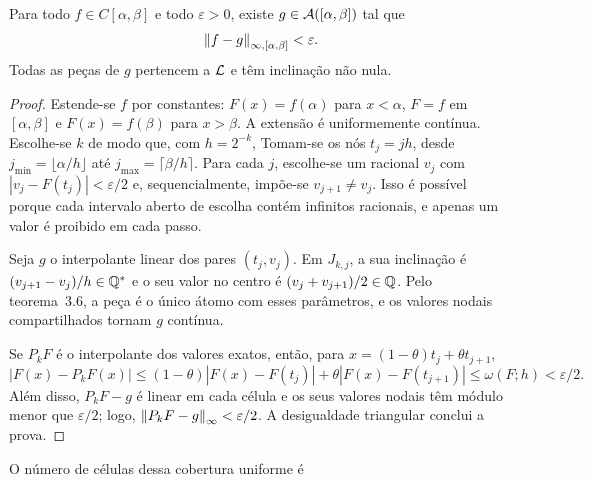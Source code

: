 \begin{teorema}\label{map:artigo_1:4.2}
Para todo $f\in C[\alpha,\beta]$ e todo $\varepsilon>0$, existe $g\in\mathcal A([\alpha,\beta])$ tal que
\[
\left\|f-g\right\|_{\infty,[\alpha,\beta]}<\varepsilon.
\]
Todas as peças de $g$ pertencem a $\mathcal L$ e têm inclinação não nula.
\end{teorema}
\begin{proof}
Estende-se $f$ por constantes: $F(x)=f(\alpha)$ para $x<\alpha$, $F=f$ em $[\alpha,\beta]$ e $F(x)=f(\beta)$ para $x>\beta$. A extensão é uniformemente contínua. Escolhe-se $k$ de modo que, com $h=2^{-k}$,
Tomam-se os nós $t_j=jh$, desde $j_{\min}=\lfloor\alpha/h\rfloor$ até $j_{\max}=\lceil\beta/h\rceil$. Para cada $j$, escolhe-se um racional $v_j$ com $|v_j-F(t_j)|<\varepsilon/2$ e, sequencialmente, impõe-se $v_{j+1}\ne v_j$. Isso é possível porque cada intervalo aberto de escolha contém infinitos racionais, e apenas um valor é proibido em cada passo.

Seja $g$ o interpolante linear dos pares $(t_j,v_j)$. Em $J_{k,j}$, a sua inclinação é $(v_{j+1}-v_j)/h\in\mathbb Q^*$ e o seu valor no centro é $(v_j+v_{j+1})/2\in\mathbb Q$. Pelo teorema~3.6, a peça é o único átomo com esses parâmetros, e os valores nodais compartilhados tornam $g$ contínua.

Se $P_kF$ é o interpolante dos valores exatos, então, para $x=(1-\theta)t_j+\theta t_{j+1}$,
\[
|F(x)-P_kF(x)|\le(1-\theta)|F(x)-F(t_j)|+\theta|F(x)-F(t_{j+1})|
\le\omega(F;h)<\varepsilon/2.
\]
Além disso, $P_kF-g$ é linear em cada célula e os seus valores nodais têm módulo menor que $\varepsilon/2$; logo, $\left\|P_kF-g\right\|_{\infty}<\varepsilon/2$. A desigualdade triangular conclui a prova.
\end{proof}
O número de células dessa cobertura uniforme é

